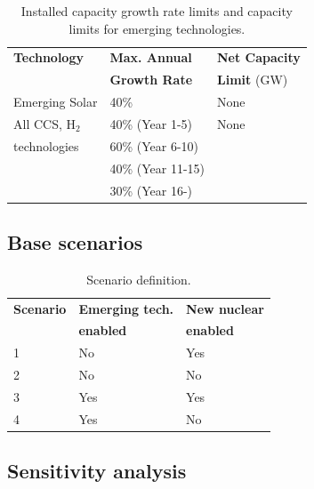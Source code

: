 \begin{table}[!ht]
	\caption{Installed capacity growth rate limits and capacity limits for emerging technologies.}
	\vspace{0.1in}
	\begin{tabularx}{\textwidth}{p{} p{} p{} }
		\hline
\textbf{Technology} & \textbf{Max. Annual} & \textbf{Net Capacity} \\
  & \textbf{Growth Rate}  & \textbf{Limit} (GW) \\
\hline
Emerging Solar & 40\% & None \\
All CCS, H$_2$ & 40\% (Year 1-5) & None \\
technologies & 60\% (Year 6-10) &  \\
 & 40\% (Year 11-15) & \\
 & 30\% (Year 16-) & \\
\hline 
\end{tabularx}
\label{emerging-gro}
\end{table}

\subsection{Base scenarios} \label{scendef}

\begin{table}[!ht]
	\caption{Scenario definition.}
	\vspace{0.1in}
	\begin{tabularx}{\textwidth}{p{} p{} p{}}
\hline 
\textbf{Scenario}& \textbf{Emerging tech.} & \textbf{New nuclear} \\
                 & \textbf{enabled} & \textbf{enabled} \\
                  \hline
1               &   No       &      Yes     \\ 
2               &  No       &         No       \\ 
3               &   Yes     &      Yes     \\ 
4               &   Yes     &         No       \\

\hline
	\end{tabularx}
\label{scen-table}
\end{table}



\subsection{Sensitivity analysis}

